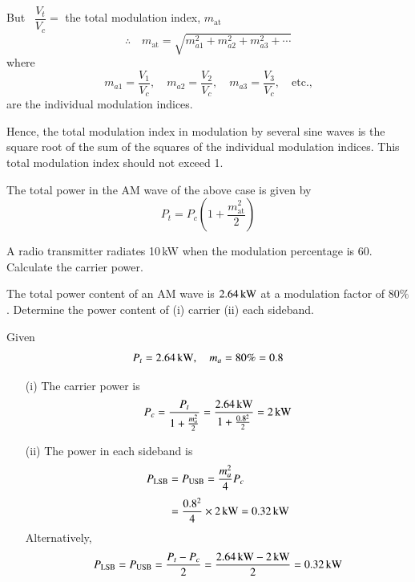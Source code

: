 But \ $\dfrac{V_{t}}{V_{c}}=$ the total modulation index, $m_{\text{at}}$
$$
\therefore\quad m_{\text{at}}=\sqrt{m^{2}_{a1}+m^{2}_{a2}+m^{2}_{a3}+\cdots}
$$
where
$$
m_{a1}=\dfrac{V_{1}}{V_{c}},\quad m_{a2}=\dfrac{V_{2}}{V_{c}},\quad m_{a3}=\dfrac{V_{3}}{V_{c}},\quad\text{etc.,}
$$
are the individual modulation indices.

Hence, the total modulation index in modulation by several sine waves is the square root of the sum of the squares of the individual modulation indices. This total modulation index should not exceed 1.

The total power in the AM wave of the above case is given by
\begin{equation}
P_{t}=P_{c}\left(1+\frac{m^{2}_{\text{at}}}{2}\right)\label{eq9.38}
\end{equation}

\begin{example}\label{exam9.4}
A radio transmitter radiates 10\,kW when the modulation percentage is 60. Calculate the carrier power.
\end{example}


\vfill\eject

\begin{example}\label{exam9.5}
The total power content of an AM wave is $2.64\text{\,kW}$ at a modulation factor of $80\%$. Determine the power content of (i) carrier (ii) each sideband.
\end{example}

\begin{solution}
Given
$$
P_{t}=2.64\text{\,kW},\quad m_{a}=80\%=0.8
$$
\begin{itemize}
\item[(i)] The carrier power is
$$
P_{c}=\dfrac{P_{t}}{1+\frac{m^{2}_{a}}{2}}=\dfrac{2.64\,\text{kW}}{1+\frac{0.8^{2}}{2}}=2\text{\,kW}
$$

\item[(ii)] The power in each sideband is
\begin{align*}
P_{\text{LSB}} &= P_{\text{USB}}=\frac{m^{2}_{a}}{4}P_{c}\\[3pt]
&= \frac{0.8^{2}}{4}\times 2\,\text{kW}=0.32\text{\,kW}
\end{align*}
Alternatively,
$$
P_{\text{LSB}}=P_{\text{USB}}=\frac{P_{t}-P_{c}}{2}=\dfrac{2.64\text{\,kW}-2\text{\,kW}}{2}=0.32\text{\,kW}
$$
\end{itemize}
\end{solution}

